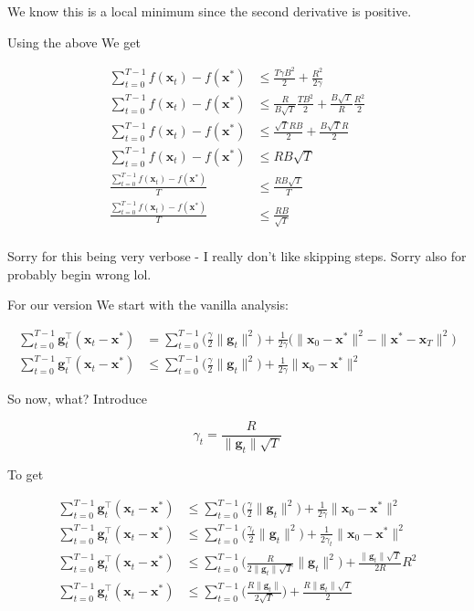 \documentclass{article}
\begin{document}
		We know this is a local minimum since the second derivative is positive. 
		
		Using the above We get
		
		\begin{align*}
			\sum^{T-1}_{t=0}f(\mathbf{x}_t) - f(\mathbf{x}^*) &\le  \frac{T \gamma B^2}{2}  + \frac{R^2}{2\gamma} \\
			\sum^{T-1}_{t=0}f(\mathbf{x}_t) - f(\mathbf{x}^*) &\le  \frac{R}{B\sqrt{T} }\frac{T B^2}{2}  + \frac{B\sqrt{T} }{R}\frac{R^2}{2} \\
			\sum^{T-1}_{t=0}f(\mathbf{x}_t) - f(\mathbf{x}^*) &\le \frac{\sqrt{T}R B}{2}  + \frac{B\sqrt{T} R}{2}\\
			\sum^{T-1}_{t=0}f(\mathbf{x}_t) - f(\mathbf{x}^*) &\le RB\sqrt{T}\\
			\frac{\sum^{T-1}_{t=0}f(\mathbf{x}_t) - f(\mathbf{x}^*)}{T} &\le \frac{RB\sqrt{T}}{T}\\
			\frac{\sum^{T-1}_{t=0}f(\mathbf{x}_t) - f(\mathbf{x}^*)}{T} &\le \frac{RB}{\sqrt{T}}\\
		\end{align*}
		
Sorry for this being very verbose - I really don't like skipping steps. Sorry also for probably begin wrong lol. 

For our version We start with the vanilla analysis:

\begin{align*}
	\sum^{T-1}_{t=0} \mathbf{g}_t^\top (\mathbf{x}_t - \mathbf{x}^*) &= \sum^{T-1}_{t=0} \bigg(  \frac{\gamma}{2} \|\mathbf{g}_t\|^2\bigg) + \frac{1}{2\gamma}\big( \|\mathbf{x}_0 - \mathbf{x}^*\|^2 - \| \mathbf{x}^* - \mathbf{x}_{T} \|^2 \big)\\
	\sum^{T-1}_{t=0} \mathbf{g}_t^\top (\mathbf{x}_t - \mathbf{x}^*) &\le \sum^{T-1}_{t=0} \bigg(  \frac{\gamma}{2} \|\mathbf{g}_t\|^2\bigg) + \frac{1}{2\gamma} \|\mathbf{x}_0 - \mathbf{x}^*\|^2
\end{align*}

So now, what? Introduce

\[ \gamma_t = \frac{R}{\|\mathbf{g}_t\| \sqrt{T}} \]

To get 

\begin{align*}
	\sum^{T-1}_{t=0} \mathbf{g}_t^\top (\mathbf{x}_t - \mathbf{x}^*) &\le \sum^{T-1}_{t=0} \bigg(  \frac{\gamma}{2} \|\mathbf{g}_t\|^2\bigg) + \frac{1}{2\gamma} \|\mathbf{x}_0 - \mathbf{x}^*\|^2\\
	\sum^{T-1}_{t=0} \mathbf{g}_t^\top (\mathbf{x}_t - \mathbf{x}^*) &\le \sum^{T-1}_{t=0} \bigg(  \frac{\gamma_t}{2} \|\mathbf{g}_t\|^2\bigg) + \frac{1}{2\gamma_t} \|\mathbf{x}_0 - \mathbf{x}^*\|^2\\
	\sum^{T-1}_{t=0} \mathbf{g}_t^\top (\mathbf{x}_t - \mathbf{x}^*) &\le \sum^{T-1}_{t=0} \bigg( \frac{R}{2\|\mathbf{g}_t\| \sqrt{T}} \|\mathbf{g}_t\|^2\bigg) +\frac{\|\mathbf{g}_t\| \sqrt{T}}{2R} R^2\\
	\sum^{T-1}_{t=0} \mathbf{g}_t^\top (\mathbf{x}_t - \mathbf{x}^*) &\le \sum^{T-1}_{t=0} \bigg( \frac{R \|\mathbf{g}_t\| }{2 \sqrt{T}} \bigg) +\frac{R \|\mathbf{g}_t\| \sqrt{T}}{2}
\end{align*}
\end{document}

